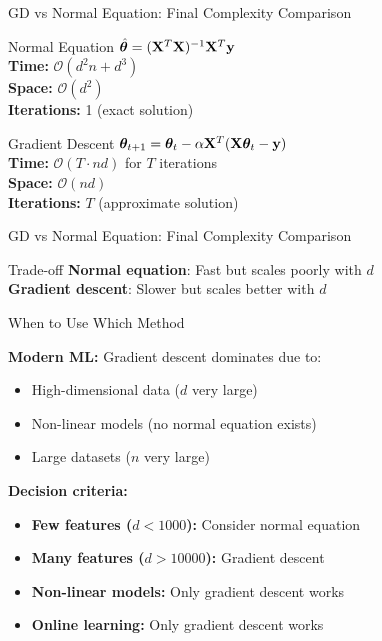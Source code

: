 \documentclass[usenames,dvipsnames]{beamer}
\begin{document}
  \begin{frame}{GD vs Normal Equation: Final Complexity Comparison}
    \begin{alertbox}{Normal Equation}
    $\hat{\boldsymbol{\theta}} = (\mathbf{X}^T\mathbf{X})^{-1}\mathbf{X}^T\mathbf{y}$
    \\\textbf{Time:} $\mathcal{O}(d^2n + d^3)$
    \\\textbf{Space:} $\mathcal{O}(d^2)$ 
    \\\textbf{Iterations:} 1 (exact solution)
    \end{alertbox}
    
    \pause
    \begin{keypointsbox}{Gradient Descent}  
    $\boldsymbol{\theta}_{t+1} = \boldsymbol{\theta}_t - \alpha \mathbf{X}^T(\mathbf{X}\boldsymbol{\theta}_t - \mathbf{y})$
    \\\textbf{Time:} $\mathcal{O}(T \cdot nd)$ for $T$ iterations
    \\\textbf{Space:} $\mathcal{O}(nd)$
    \\\textbf{Iterations:} $T$ (approximate solution)
    \end{keypointsbox}
    
  \end{frame}

  \begin{frame}{GD vs Normal Equation: Final Complexity Comparison}
    \begin{theorembox}{Trade-off}
    \textbf{Normal equation}: Fast but scales poorly with $d$ \\
    \textbf{Gradient descent}: Slower but scales better with $d$
    \end{theorembox}
  \end{frame}

  \begin{frame}{When to Use Which Method}
    \begin{keypointsbox}{}
    \textbf{Modern ML:} Gradient descent dominates due to:
    \begin{itemize}
        \item High-dimensional data ($d$ very large)
        \item Non-linear models (no normal equation exists)
        \item Large datasets ($n$ very large)
    \end{itemize}
    \end{keypointsbox}
    
    \pause
    \textbf{Decision criteria:}
    \begin{itemize}[<+->]
        \item \textbf{Few features ($d < 1000$):} Consider normal equation
        \item \textbf{Many features ($d > 10000$):} Gradient descent
        \item \textbf{Non-linear models:} Only gradient descent works
        \item \textbf{Online learning:} Only gradient descent works
    \end{itemize}
  \end{frame}
\end{document}
